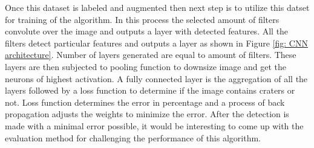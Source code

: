 \documentclass[11pt]{article}
\begin{document}
\par
Once this dataset is labeled and augmented then next step is to utilize this datset for training of the algorithm. In this process the selected amount of filters convolute over the image and outputs a layer with detected features. All the filters detect particular features and outputs a layer as shown in Figure \ref{fig: CNN architecture}. Number of layers generated are equal to amount of filters. These layers are then subjected to pooling function to downsize image and get the neurons of highest activation. A fully connected layer is the aggregation of all the layers followed by a loss function to determine if the image contains craters or not. Loss function determines the error in percentage and a process of back propagation adjusts the weights to minimize the error. After the detection is made with a minimal error possible, it would be interesting to come up with the evaluation method for challenging the performance of this algorithm.  

\newpage




	


\end{document}
